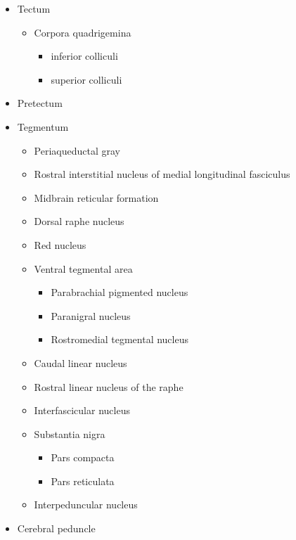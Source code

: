 \begin{itemize}
\tightlist
\item
  Tectum

  \begin{itemize}
  \tightlist
  \item
    Corpora quadrigemina

    \begin{itemize}
    \tightlist
    \item
      inferior colliculi
    \item
      superior colliculi
    \end{itemize}
  \end{itemize}
\item
  Pretectum
\item
  Tegmentum

  \begin{itemize}
  \tightlist
  \item
    Periaqueductal gray
  \item
    Rostral interstitial nucleus of medial longitudinal fasciculus
  \item
    Midbrain reticular formation
  \item
    Dorsal raphe nucleus
  \item
    Red nucleus
  \item
    Ventral tegmental area

    \begin{itemize}
    \tightlist
    \item
      Parabrachial pigmented nucleus
    \item
      Paranigral nucleus
    \item
      Rostromedial tegmental nucleus
    \end{itemize}
  \item
    Caudal linear nucleus
  \item
    Rostral linear nucleus of the raphe
  \item
    Interfascicular nucleus
  \item
    Substantia nigra

    \begin{itemize}
    \tightlist
    \item
      Pars compacta
    \item
      Pars reticulata
    \end{itemize}
  \item
    Interpeduncular nucleus
  \end{itemize}
\item
  Cerebral peduncle


\end{itemize}
